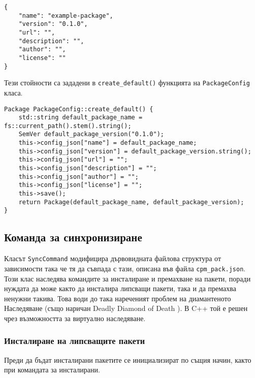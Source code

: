 \begin{lstlisting}[style=cpp,
				   caption=cpm\_pack.json по подразбиране,
				   label={lst:config-default}]
{
	"name": "example-package",
	"version": "0.1.0",
	"url": "",
	"description": "",
	"author": "",
	"license": ""
}
\end{lstlisting}

Тези стойности са зададени в \texttt{create\_default()}
 функцията на \texttt{PackageConfig} класа.

\begin{lstlisting}[style=cpp,
				   caption=Стойности по подразбиране на нов пакет,
				   label={lst:create-default}]
Package PackageConfig::create_default() {
	std::string default_package_name = fs::current_path().stem().string();
	SemVer default_package_version("0.1.0");
	this->config_json["name"] = default_package_name;
	this->config_json["version"] = default_package_version.string();
	this->config_json["url"] = "";
	this->config_json["description"] = "";
	this->config_json["author"] = "";
	this->config_json["license"] = "";
	this->save();
	return Package(default_package_name, default_package_version);
}
\end{lstlisting}


\subsection{Команда за синхронизиране}

Класът \texttt{SyncCommand} модифицира дървовидната файлова структура от
зависимости така че тя да съвпада с тази, описана във файла
\texttt{cpm\_pack.json}. Този клас наследява командите за инсталиране и
премахване на пакети, поради нуждата да може както да инсталира липсващи пакети,
така и да премахва ненужни такива. Това води до така нареченият проблем на
диамантеното Наследяване (също наричан Deadly Diamond of Death \cite{diamond}).
В C++ той е решен чрез възможността за виртуално наследяване.

\subsubsection{Инсталиране на липсващите пакети}

Преди да бъдат инсталирани пакетите се инициализират по същия начин, както при
командата за инсталирани.

